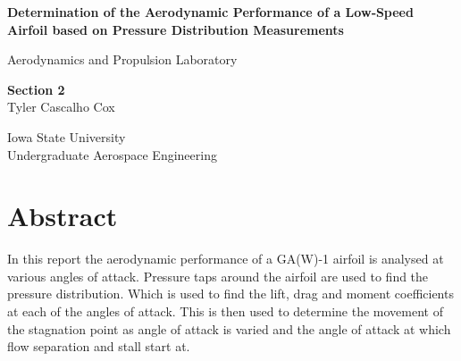 \documentclass[12pt]{article}
\begin{document}
\begin{titlepage}
    \begin{center}
        \vspace*{1cm}
            
        \LARGE
        \textbf{Determination of the Aerodynamic Performance of a Low‐Speed
Airfoil based on Pressure Distribution Measurements}
            
        \vspace{0.5cm}
        \Large
        Aerodynamics and Propulsion
Laboratory 
            
        \vspace{1.5cm}
        \large
        \textbf{Section 2}\\
        \normalsize\vspace{15 pt}
        Tyler Cascalho Cox\\
            
        \vfill
            
            
        \vspace{0.8cm}
            
            
        \Large
        Iowa State University\\
        Undergraduate Aerospace Engineering
        
            
    \end{center}
\end{titlepage}


\pagestyle{fancy}
\fancyfoot[CE,CO]{\leftmark}
\fancyfoot[LE,RO]{\thepage}


\section*{Abstract}
In this report the aerodynamic performance of a GA(W)-1 airfoil is analysed at various angles of attack. Pressure taps around the airfoil are used to find the pressure distribution. Which is used to find the lift, drag and moment coefficients at each of the angles of attack. This is then used to determine the movement of the stagnation point as angle of attack is varied and the angle of attack at which flow separation and stall start at.


\newline
\end{document}
